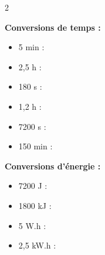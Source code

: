 \documentclass[11pt,a4paper]{article}
\begin{document}
\begin{multicols}{2}

\textbf{\large Conversions de temps :}
\vspace{3mm}


\begin{itemize}[leftmargin=1em]
    \item 5 min : \dotfill
    
    \item 2,5 h : \dotfill
    
\end{itemize}

\vspace{3mm}


\begin{itemize}[leftmargin=1em]

    \item 180 s : \dotfill
    
    \item 1,2 h : \dotfill
    
\end{itemize}

\vspace{3mm}


\begin{itemize}[leftmargin=1em]

    \item 7200 s : \dotfill
    
    \item 150 min : \dotfill
    
\end{itemize}

\columnbreak

\textbf{\large Conversions d'énergie :}

\vspace{3mm}


\begin{itemize}[leftmargin=1em]

    \item 7200 J : \dotfill
    
    \item 1800 kJ : \dotfill
    
\end{itemize}

\vspace{3mm}


\begin{itemize}[leftmargin=1em]
    \item 5 W.h : \dotfill
    
    \item 2,5 kW.h : \dotfill
    
\end{itemize}

\end{multicols}


\vfill 
\end{document}
